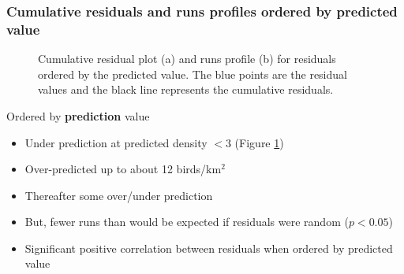 \documentclass[11pt, a4paper]{article}
\begin{document}
\begin{frame}[fragile]
\frametitle{Cumulative residuals and runs profiles ordered by predicted value}
\begin{figure}[h]
  \centering
    \caption{Cumulative residual plot (a) and runs profile (b) for residuals ordered by the predicted value.  The blue points are the residual values and the black line represents the cumulative residuals.}
  \label{fig:geeruns2}
\end{figure}
\end{frame}

\begin{frame}[fragile]
Ordered by \textbf{prediction} value
\begin{itemize}
\item Under prediction at predicted density $< 3$ (Figure \ref{fig:geeruns2})
\item Over-predicted up to about 12 birds/km$^2$
\item Thereafter some over/under prediction
\item But, fewer runs than would be expected if residuals were random ($p<0.05$)
\item Significant positive correlation between residuals when ordered by predicted value
\end{itemize}
\end{frame}
\end{document}
